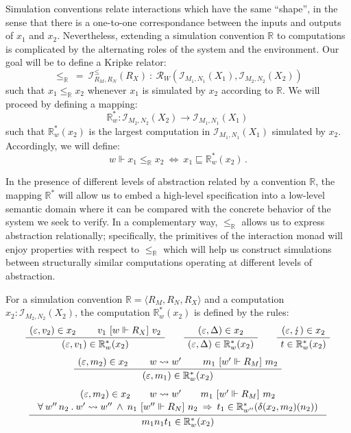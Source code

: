 Simulation conventions relate interactions which have the same ``shape'',
in the sense that there is a one-to-one correspondance between
the inputs and outputs of $x_1$ and $x_2$.
Nevertheless,
extending a simulation convention $\mathbb{R}$ to computations
is complicated by the alternating roles of the system and the environment.
Our goal will be to define a Kripke relator:
\[ {\le}_\mathbb{R} \: = \:
   \mathcal{I}^\le_{R_M,R_N}(R_X) \: : \:
   \mathcal{R}_W(\mathcal{I}_{M_1,N_1}(X_1), \mathcal{I}_{M_2,N_2}(X_2)) \]
such that $x_1 \le_\mathbb{R} x_2$
whenever $x_1$ is simulated by $x_2$ according to $\mathbb{R}$.
We will proceed by defining a mapping:
\[ \mathbb{R}^*_w : \mathcal{I}_{M_2,N_2}(X_2) \rightarrow
                    \mathcal{I}_{M_1,N_1}(X_1) \, \]
such that $\mathbb{R}^*_w(x_2)$ is
the largest computation in $\mathcal{I}_{M_1,N_1}(X_1)$
simulated by $x_2$.
Accordingly,
we will define:
\[ w \Vdash x_1 \le_\mathbb{R} x_2 \: \Leftrightarrow \:
   x_1 \sqsubseteq \mathbb{R}^*_w(x_2) \,. \]

In the presence of different levels of abstraction
related by a convention $\mathbb{R}$,
the mapping $\mathbb{R}^*$ will allow us to embed a high-level specification
into a low-level semantic domain
where it can be compared with
the concrete behavior of the system we seek to verify.
In a complementary way, $\le_\mathbb{R}$
allows us to express abstraction relationally;
specifically, the primitives of the interaction monad
will enjoy properties with respect to $\le_\mathbb{R}$
which will help us construct
simulations between
structurally similar computations
operating at different levels of abstraction.

\begin{definition}
For a simulation convention $\mathbb{R} = \langle R_M, R_N, R_X \rangle$
and a computation $x_2 : \mathcal{I}_{M_2, N_2}(X_2)$,
the computation $\mathbb{R}^*_w(x_2)$ is defined by the rules:
\begin{gather*}
  \AxiomC{$(\varepsilon, v_2) \in x_2$}
  \AxiomC{$v_1 \ifr{w \Vdash R_X} v_2$}
  \BinaryInfC{$(\varepsilon, v_1) \in \mathbb{R}^*_w(x_2)$}
  \DisplayProof
  \qquad
  \AxiomC{$(\varepsilon, \Delta) \in x_2$}
  \UnaryInfC{$(\varepsilon, \Delta) \in \mathbb{R}^*_w(x_2)$}
  \DisplayProof
  \qquad
  \AxiomC{$(\varepsilon, \lightning) \in x_2$}
  \UnaryInfC{$t \in \mathbb{R}^*_w(x_2)$}
  \DisplayProof
  \\[1ex]
  \AxiomC{$(\varepsilon, m_2) \in x_2$}
  \AxiomC{$w \leadsto w'$}
  \AxiomC{$m_1 \ifr{w' \Vdash R_M} m_2$}
  \TrinaryInfC{$(\varepsilon, m_1) \in \mathbb{R}^*_w(x_2)$}
  \DisplayProof
  \\[1ex]
  \AxiomC{$
    \begin{array}{c}
      (\varepsilon, m_2) \in x_2 \qquad
      w \leadsto w' \qquad
      m_1 \ifr{w' \Vdash R_M} m_2
      \\[.3ex]
      \forall \: w'' \, n_2 \:.\:
        w' \leadsto w'' \: \wedge \:
        n_1 \ifr{w'' \Vdash R_N} n_2 \: \Rightarrow \:
        t_1 \in \mathbb{R}^*_{w''}(\delta(x_2, m_2)(n_2))
    \end{array}$}
  \UnaryInfC{$m_1 n_1 t_1 \in \mathbb{R}^*_w(x_2)$}
  \DisplayProof
\end{gather*}
\end{definition}

